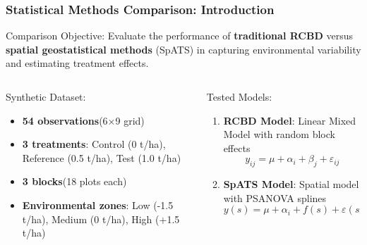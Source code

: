 \documentclass[aspectratio=43]{beamer}
\begin{document}
\begin{frame}
    \frametitle{Statistical Methods Comparison: Introduction}
    
    \begin{block}{Comparison Objective:}
        Evaluate the performance of \textbf{traditional RCBD} versus \textbf{spatial geostatistical methods} (SpATS) in capturing environmental variability and estimating treatment effects.
    \end{block}
    
    \begin{columns}
        \begin{column}{0.5\textwidth}
            \begin{exampleblock}{Synthetic Dataset:}
                \begin{itemize}
                    \item \textbf{\small 54 observations}\small (6×9 grid)
                    \item \textbf{\small 3 treatments}\small : Control (0 t/ha), Reference (0.5 t/ha), Test (1.0 t/ha)
                    \item \textbf{\small 3 blocks}\small (18 plots each)
                    \item \textbf{\small Environmental zones}\small : Low (-1.5 t/ha), Medium (0 t/ha), High (+1.5 t/ha)
                \end{itemize}
            \end{exampleblock}
        \end{column}
        
        \begin{column}{0.5\textwidth}
            \begin{alertblock}{Tested Models:}
                \begin{enumerate}
                    \item \textbf{RCBD Model}: Linear Mixed Model with random block effects
                    \begin{equation*}
                        y_{ij} = \mu + \alpha_i + \beta_j + \varepsilon_{ij}
                    \end{equation*}
                    
                    \item \textbf{SpATS Model}: Spatial model with PSANOVA splines
                    \begin{equation*}
                        y(s) = \mu + \alpha_i + f(s) + \varepsilon(s)
                    \end{equation*}
                \end{enumerate}
            \end{alertblock}
        \end{column}
    \end{columns}
    

\end{frame}
\end{document}
